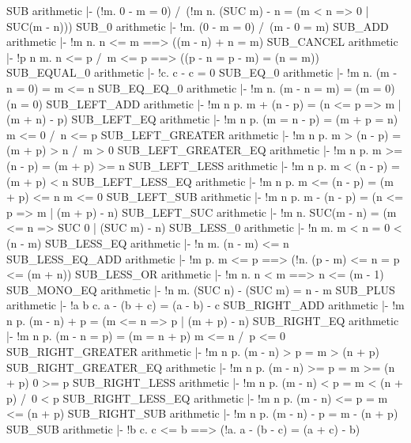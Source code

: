 \ENDTHEOREM
\THEOREM SUB arithmetic
|- (!m. 0 - m = 0) /\ (!m n. (SUC m) - n = (m < n => 0 | SUC(m - n)))
\ENDTHEOREM
\THEOREM SUB\_0 arithmetic
|- !m. (0 - m = 0) /\ (m - 0 = m)
\ENDTHEOREM
\THEOREM SUB\_ADD arithmetic
|- !m n. n <= m ==> ((m - n) + n = m)
\ENDTHEOREM
\THEOREM SUB\_CANCEL arithmetic
|- !p n m. n <= p /\ m <= p ==> ((p - n = p - m) = (n = m))
\ENDTHEOREM
\THEOREM SUB\_EQUAL\_0 arithmetic
|- !c. c - c = 0
\ENDTHEOREM
\THEOREM SUB\_EQ\_0 arithmetic
|- !m n. (m - n = 0) = m <= n
\ENDTHEOREM
\THEOREM SUB\_EQ\_EQ\_0 arithmetic
|- !m n. (m - n = m) = (m = 0) \/ (n = 0)
\ENDTHEOREM
\THEOREM SUB\_LEFT\_ADD arithmetic
|- !m n p. m + (n - p) = (n <= p => m | (m + n) - p)
\ENDTHEOREM
\THEOREM SUB\_LEFT\_EQ arithmetic
|- !m n p. (m = n - p) = (m + p = n) \/ m <= 0 /\ n <= p
\ENDTHEOREM
\THEOREM SUB\_LEFT\_GREATER arithmetic
|- !m n p. m > (n - p) = (m + p) > n /\ m > 0
\ENDTHEOREM
\THEOREM SUB\_LEFT\_GREATER\_EQ arithmetic
|- !m n p. m >= (n - p) = (m + p) >= n
\ENDTHEOREM
\THEOREM SUB\_LEFT\_LESS arithmetic
|- !m n p. m < (n - p) = (m + p) < n
\ENDTHEOREM
\THEOREM SUB\_LEFT\_LESS\_EQ arithmetic
|- !m n p. m <= (n - p) = (m + p) <= n \/ m <= 0
\ENDTHEOREM
\THEOREM SUB\_LEFT\_SUB arithmetic
|- !m n p. m - (n - p) = (n <= p => m | (m + p) - n)
\ENDTHEOREM
\THEOREM SUB\_LEFT\_SUC arithmetic
|- !m n. SUC(m - n) = (m <= n => SUC 0 | (SUC m) - n)
\ENDTHEOREM
\THEOREM SUB\_LESS\_0 arithmetic
|- !n m. m < n = 0 < (n - m)
\ENDTHEOREM
\THEOREM SUB\_LESS\_EQ arithmetic
|- !n m. (n - m) <= n
\ENDTHEOREM
\THEOREM SUB\_LESS\_EQ\_ADD arithmetic
|- !m p. m <= p ==> (!n. (p - m) <= n = p <= (m + n))
\ENDTHEOREM
\THEOREM SUB\_LESS\_OR arithmetic
|- !m n. n < m ==> n <= (m - 1)
\ENDTHEOREM
\THEOREM SUB\_MONO\_EQ arithmetic
|- !n m. (SUC n) - (SUC m) = n - m
\ENDTHEOREM
\THEOREM SUB\_PLUS arithmetic
|- !a b c. a - (b + c) = (a - b) - c
\ENDTHEOREM
\THEOREM SUB\_RIGHT\_ADD arithmetic
|- !m n p. (m - n) + p = (m <= n => p | (m + p) - n)
\ENDTHEOREM
\THEOREM SUB\_RIGHT\_EQ arithmetic
|- !m n p. (m - n = p) = (m = n + p) \/ m <= n /\ p <= 0
\ENDTHEOREM
\THEOREM SUB\_RIGHT\_GREATER arithmetic
|- !m n p. (m - n) > p = m > (n + p)
\ENDTHEOREM
\THEOREM SUB\_RIGHT\_GREATER\_EQ arithmetic
|- !m n p. (m - n) >= p = m >= (n + p) \/ 0 >= p
\ENDTHEOREM
\THEOREM SUB\_RIGHT\_LESS arithmetic
|- !m n p. (m - n) < p = m < (n + p) /\ 0 < p
\ENDTHEOREM
\THEOREM SUB\_RIGHT\_LESS\_EQ arithmetic
|- !m n p. (m - n) <= p = m <= (n + p)
\ENDTHEOREM
\THEOREM SUB\_RIGHT\_SUB arithmetic
|- !m n p. (m - n) - p = m - (n + p)
\ENDTHEOREM
\THEOREM SUB\_SUB arithmetic
|- !b c. c <= b ==> (!a. a - (b - c) = (a + c) - b)
